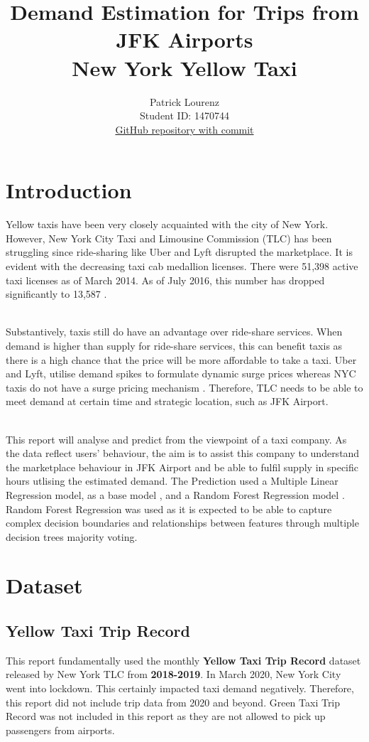 \documentclass[11pt]{article}
\title{\textbf{Demand Estimation for Trips from JFK Airports} \\ {New York Yellow Taxi}}
\author{
Patrick Lourenz \\
Student ID: 1470744 \\
\href{https://github.com/MAST30034-Applied-Data-Science/mast30034-project-1-pl0203/commit/eea592dc589340d50c9e1d20522327cdd9c7723d}{GitHub repository with commit}
}
\begin{document}
\maketitle

\section{Introduction}

Yellow taxis have been very closely acquainted with the city of New York. However, New York City Taxi and Limousine Commission (TLC) has been struggling since ride-sharing like Uber and Lyft disrupted the marketplace. It is evident with the decreasing taxi cab medallion licenses. There were 51,398 active taxi licenses as of March 2014. As of July 2016, this number has dropped significantly to 13,587 \cite{taxi1}. 

\\
Substantively, taxis still do have an advantage over ride-share services. When demand is higher than supply for ride-share services, this can benefit taxis as there is a high chance that the price will be more affordable to take a taxi. Uber and Lyft, utilise demand spikes to formulate dynamic surge prices whereas NYC taxis do not have a surge pricing mechanism \cite{taxistrive}. Therefore, TLC needs to be able to meet demand at certain time and strategic location, such as JFK Airport.  

\\
This report will analyse and predict from the viewpoint of a taxi company. As the data reflect users' behaviour, the aim is to assist this company to understand the marketplace behaviour in JFK Airport and be able to fulfil supply in specific hours utlising the estimated demand. The Prediction used a Multiple Linear Regression model, as a base model \cite{mlr}, and a Random Forest Regression model \cite{rf}. Random Forest Regression was used as it is expected to be able to capture complex decision boundaries and relationships between features through multiple decision trees majority voting.
\\

\section{Dataset}
\subsection{Yellow Taxi Trip Record}
This report fundamentally used the monthly \textbf{Yellow Taxi Trip Record} dataset released by New York TLC from \textbf{2018-2019}\cite{nyctaxi}. In March 2020, New York City went into lockdown. This certainly impacted taxi demand negatively. Therefore, this report did not include trip data from 2020 and beyond. Green Taxi Trip Record was not included in this report as they are not allowed to pick up passengers from airports. 
\end{document}
